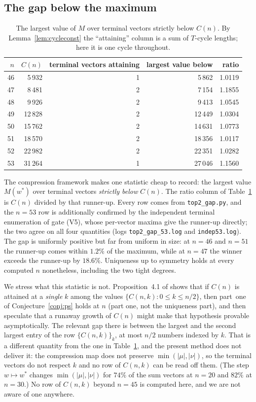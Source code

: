 \documentclass[11pt]{article}
\theoremstyle{remark}
\begin{document}
\subsection*{The gap below the maximum}

\begin{table}[H]
\centering
\begin{tabular}{rrrrr}
\toprule
$n$ & $C(n)$ & terminal vectors attaining & largest value below & ratio \\
\midrule
46 & 5\,932  & 1 & 5\,862  & 1.0119 \\
47 & 8\,481  & 2 & 7\,154  & 1.1855 \\
48 & 9\,926  & 2 & 9\,413  & 1.0545 \\
49 & 12\,828 & 2 & 12\,449 & 1.0304 \\
50 & 15\,762 & 2 & 14\,631 & 1.0773 \\
51 & 18\,570 & 2 & 18\,356 & 1.0117 \\
52 & 22\,982 & 2 & 22\,351 & 1.0282 \\
53 & 31\,264 & 1 & 27\,046 & 1.1560 \\
\bottomrule
\end{tabular}
\caption{The largest value of $M$ over terminal vectors strictly below $C(n)$. By
Lemma~\ref{lem:cycleconst} the ``attaining'' column is a sum of $T$-cycle lengths; here
it is one cycle throughout.}
\label{tab:gap}
\end{table}

The compression framework makes one statistic cheap to record: the largest value
$M(w^\ast)$ over terminal vectors \emph{strictly below} $C(n)$. The ratio column of
Table~\ref{tab:gap} is $C(n)$ divided by that runner-up. Every row comes from
\texttt{top2\_gap.py}, and the $n=53$ row is additionally confirmed by the
independent terminal enumeration of gate (V5), whose per-vector maxima give
the runner-up directly; the two agree on all four quantities
(logs \texttt{top2\_gap\_53.log} and \texttt{indep53.log}). The gap is uniformly positive but far from uniform in size: at
$n=46$ and $n=51$ the runner-up comes within $1.2\%$ of the maximum, while at $n=47$
the winner exceeds the runner-up by $18.6\%$.
Uniqueness up to symmetry holds at every computed $n$ nonetheless, including the two
tight degrees.

We stress what this statistic is not. Proposition~4.1 of \cite{PS26} shows that if $C(n)$
is attained at a \emph{single} $k$ among the values $\{C(n,k):0\le k\le n/2\}$, then
part~one of Conjecture~\ref{conj:ps} holds at $n$ (part one, not the uniqueness part),
and \cite{PS26} then speculate that a runaway growth of $C(n)$ might make that hypothesis
provable asymptotically. The relevant gap there is between the largest and the second
largest entry of the row $\{C(n,k)\}_k$, at most $n/2$ numbers indexed by $k$. That is a
different quantity from the one in Table~\ref{tab:gap}, and the present method does not
deliver it: the compression map does not preserve $\min(|\mu|,|\nu|)$, so the terminal
vectors do not respect $k$ and no row of $C(n,k)$ can be read off them. (The step
$w\mapsto w^\ast$ changes $\min(|\mu|,|\nu|)$ for $74\%$ of the sum vectors at $n=20$
and $82\%$ at $n=30$.) No row of $C(n,k)$ beyond $n=45$ is computed here, and we
are not aware of one anywhere.
\end{document}

